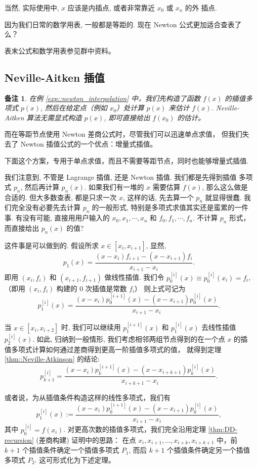 \documentclass[a4paper]{ctexart}
\newtheorem{remark}{备注}
\numberwithin{theorem}{section}
\numberwithin{equation}{section}
\numberwithin{figure}{section}
\numberwithin{remark}{section}
\begin{document}
当然, 实际使用中, $x$ 应该是内插点, 或者非常靠近 $x_0$ 或 $x_n$ 的外
插点.

因为我们日常的数学用表, 一般都是等距的. 现在 Newton 公式更加适合查表了么？

表末公式和数学用表参见群中资料。



\subsection{Neville-Aitken 插值}

\begin{remark}
在例 \ref{exp::newton_interpolation} 中，我们先构造了函数 $f(x)$ 的插值多项式 $p(x)$, 
然后在给定点（例如 $x_0$）处计算 $p(x)$ 来估计 $f(x)$. Neville-Aitken 算法无需显式构造 $p(x)$, 
即可直接给出 $f(x_0)$ 的估计。
\end{remark}

而在等距节点使用 Newton 差商公式时，尽管我们可以迅速单点求值，
但我们失去了 Newton 插值公式的一个优点：增量式插值。

下面这个方案，专用于单点求值，而且不需要等距节点，同时也能够增量式插值. 

我们注意到, 不管是 Lagrange 插值, 还是 Newton 插值. 我们都是先得到插值
多项式 $p_n$, 然后再计算 $p_n(x)$. 如果我们有一堆的 $x$ 需要估算
$f(x)$, 那么这么做是合适的. 但大多数查表, 都是只求一次 $x$, 这样的话,
先去算一个 $p_n$ 就显得很蠢. 我们完全没有必要先去计算 $p_n$ 的一般形式,
特别是多项式求值其实还是蛮累的一件事. 有没有可能, 
直接用用户输入的 $x_0, x_1, \cdots, x_n$ 和 $f_0, f_1,
\cdots, f_n$. 不计算 $p_n$ 形式，而直接给出 $p_n(x)$ 的值?


这件事是可以做到的. 假设所求 $x \in [x_i, x_{i + 1}]$, 显然,
$$
p_1(x) = \frac{(x - x_i)f_{i + 1} - (x - x_{i + 1})f_i}{x_{i + 1} - x_i}.
$$
即用 $(x_i, f_i)$ 和 $(x_{i + 1}, f_{i + 1})$ 做线性插值. 
我们令 $p_0^{[i]}(x) \equiv p_0^{[i]}(x_i) = f_i$, （即用 $(x_i, f_i)$ 构建的 
$0$ 次插值是常数 $f_i$）
则上式可记为
$$
p_1^{[i]}(x) = \frac{(x - x_i)p_0^{[i + 1]}(x) - (x - x_{i + 1})p_0^{[i]}(x)}{x_{i + 1} - x_i}.
$$

当 $x \in [x_i, x_{i + 2}]$ 时, 我们可以继续用 $p_1^{[i + 1]}(x)$ 和
$p_1^{[i]}(x)$ 去线性插值 $p_2^{[i]}(x)$. 如此, 归纳到一般情形, 
我们考虑相邻两组节点得到的在一个点 $x$ 的插值多项式计算如何通过差商得到更高一阶插值多项式的值，
就得到定理 \ref{thm::Neville-Atkinson} 的结论:
$$
p_{k + 1}^{[i]} = \frac{(x - x_i)p_k^{[i + 1]}(x) - (x - x_{i + k + 1})p_k^{[i]}(x)}{x_{i + k + 1} - x_i}.
$$


或者说，为从插值条件构造这样的线性多项式，我们有
\begin{equation*}
p^{[i]}_{1}(x):=\frac{(x-x_i)p^{[i+1]}_{0}(x)-(x-x_{i+1})p^{[i]}_{0}(x)}{x_{i+1}-x_i},
\end{equation*}
其中 $p^{[i]}_{0}=f(x_i)$. 对更高次数的插值多项式，我们完全沿用定理 \ref{thm:DD-recursion} (差商构建) 证明中的思路：
在点 $x_i,x_{i+1},\ldots,x_{i+k},x_{i+k+1}$ 中，前 $k+1$ 个插值条件确定一个插值多项式 $P_1$, 
而后 $k+1$ 个插值条件确定另一个插值多项式 $P_2$. 这可形式化为下述定理。
\end{document}

